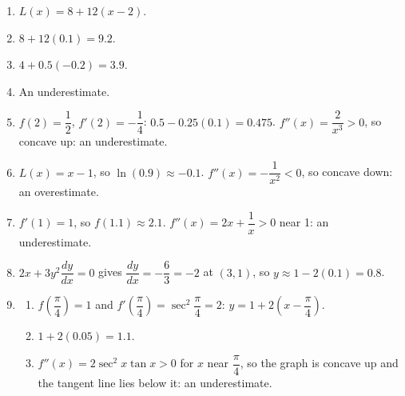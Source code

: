 \documentclass[11pt]{article}
\begin{document}
\newpage
\begin{solbox}
\begin{enumerate}[leftmargin=*,itemsep=4pt]
  \item $L(x)=8+12(x-2)$.
  \item $8+12(0.1)=9.2$.
  \item $4+0.5(-0.2)=3.9$.
  \item An underestimate.
  \item $f(2)=\dfrac12$, $f'(2)=-\dfrac14$: $0.5-0.25(0.1)=0.475$. $f''(x)=\dfrac{2}{x^3}>0$, so concave up: an underestimate.
  \item $L(x)=x-1$, so $\ln(0.9)\approx-0.1$. $f''(x)=-\dfrac{1}{x^2}<0$, so concave down: an overestimate.
  \item $f'(1)=1$, so $f(1.1)\approx2.1$. $f''(x)=2x+\dfrac1x>0$ near 1: an underestimate.
  \item $2x+3y^2\dfrac{dy}{dx}=0$ gives $\dfrac{dy}{dx}=-\dfrac{6}{3}=-2$ at $(3,1)$, so $y\approx1-2(0.1)=0.8$.
  \item \begin{enumerate}[label=(\alph*),leftmargin=*,itemsep=3pt]
    \item $f\!\left(\dfrac\pi4\right)=1$ and $f'\!\left(\dfrac\pi4\right)=\sec^2\dfrac\pi4=2$: $y=1+2\left(x-\dfrac\pi4\right)$.
    \item $1+2(0.05)=1.1$.
    \item $f''(x)=2\sec^2x\tan x>0$ for $x$ near $\dfrac\pi4$, so the graph is concave up and the tangent line lies below it: an underestimate.
  \end{enumerate}
\end{enumerate}
\end{solbox}
\end{document}
